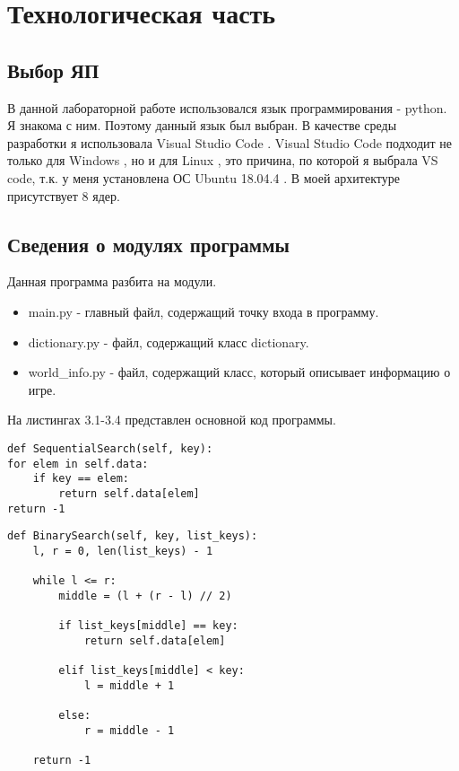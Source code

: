 \chapter{Технологическая часть}

\section{Выбор ЯП}

В данной лабораторной работе использовался язык программирования - python. \cite{Python}
Я знакома с ним.
Поэтому данный язык был выбран.
В качестве среды разработки я использовала Visual Studio Code \cite{Vs}.
Visual Studio Code подходит не только для  Windows \cite{Win},
но и для Linux \cite{Lin}, это причина,
по которой я выбрала VS code,
т.к. у меня установлена ОС Ubuntu 18.04.4 \cite{Ubuntu}.
В моей архитектуре присутствует 8 ядер.

\section{Сведения о модулях программы}

Данная программа разбита на модули.

\begin{itemize}
	\item main.py - главный файл, содержащий точку входа в программу.
	\item dictionary.py - файл, содержащий класс dictionary.
	\item world\_info.py - файл, содержащий класс, который описывает информацию о игре.
\end{itemize}

На листингах 3.1-3.4 представлен основной код программы.


\begin{lstlisting}[label=some-code,caption=Поиск полным перебором]
def SequentialSearch(self, key):
for elem in self.data:
	if key == elem:
		return self.data[elem]
return -1
\end{lstlisting}

\begin{lstlisting}[label=some-code,caption=Бинарный поиск]
def BinarySearch(self, key, list_keys):
	l, r = 0, len(list_keys) - 1

	while l <= r:
		middle = (l + (r - l) // 2)  

		if list_keys[middle] == key:
			return self.data[elem]

		elif list_keys[middle] < key:
			l = middle + 1
		
		else:
			r = middle - 1

	return -1
\end{lstlisting}

